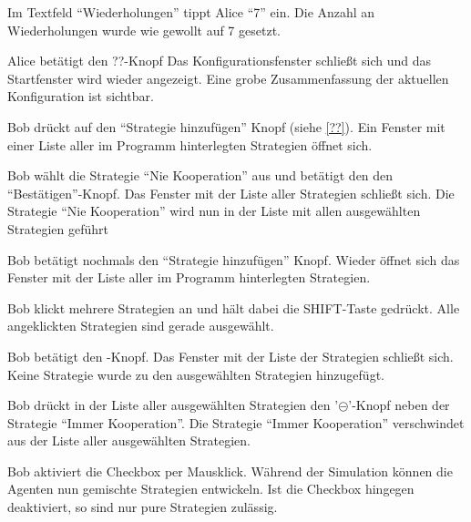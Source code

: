 \documentclass[parskip=full,11pt,twoside]{scrartcl}
\begin{document}
{Im Textfeld \enquote{Wiederholungen} tippt Alice \enquote{7} ein.}%
{Die Anzahl an Wiederholungen wurde wie gewollt auf 7 gesetzt.}

{Alice betätigt den ??-Knopf}
{Das Konfigurationsfenster schließt sich und das Startfenster wird wieder angezeigt. Eine grobe Zusammenfassung der aktuellen Konfiguration ist sichtbar.}



%
{Bob drückt auf den \enquote{Strategie hinzufügen} Knopf (siehe \cref{??}).}
{Ein Fenster mit einer Liste aller im Programm hinterlegten Strategien öffnet sich.}

\teststep{}
{Bob wählt die Strategie \enquote{Nie Kooperation} aus und betätigt den den \enquote{Bestätigen}-Knopf.}
{Das Fenster mit der Liste aller Strategien schließt sich. Die Strategie \enquote{Nie Kooperation} wird nun in der Liste mit allen ausgewählten Strategien geführt}

{Bob betätigt nochmals den  \enquote{Strategie hinzufügen} Knopf.}
{Wieder öffnet sich das Fenster mit der Liste aller im Programm hinterlegten Strategien.}

\teststep{}
{Bob klickt mehrere Strategien an und hält dabei die SHIFT-Taste gedrückt.}
{Alle angeklickten Strategien sind gerade ausgewählt.}

\teststep{}
{Bob betätigt den -Knopf.}
{Das Fenster mit der Liste der Strategien schließt sich. Keine Strategie wurde zu den ausgewählten Strategien hinzugefügt.}

{Bob drückt in der Liste aller ausgewählten Strategien den '\(\circleddash\)'-Knopf neben der Strategie \enquote{Immer Kooperation}.}
{Die Strategie \enquote{Immer Kooperation} verschwindet aus der Liste aller ausgewählten Strategien.}

{Bob aktiviert die Checkbox  per Mausklick.}
{Während der Simulation können die Agenten nun gemischte Strategien entwickeln. Ist die Checkbox hingegen deaktiviert, so sind nur pure Strategien zulässig.}

\end{document}

